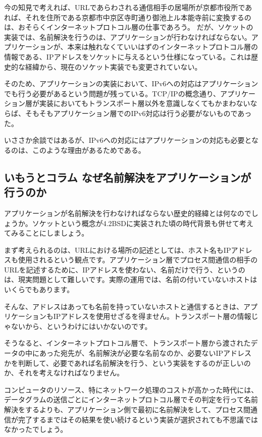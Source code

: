 今の知見で考えれば、URLであらわされる通信相手の居場所が京都市役所であれば、それを住所である京都市中京区寺町通り御池上ル本能寺前に変換するのは、おそらくインターネットプロトコル層の仕事であろう。
だが、ソケットの実装では、名前解決を行うのは、アプリケーションが行わなければならない。アプリケーションが、本来は触れなくていいはずのインターネットプロトコル層の情報である、IPアドレスをソケットに与えるという仕様になっている。これは歴史的な経緯から、現在のソケット実装でも変更されていない。

そのため、アプリケーションの実装において、IPv6への対応はアプリケーションでも行う必要があるという問題が残っている。TCP/IPの概念通り、アプリケーション層が実装においてもトランスポート層以外を意識しなくてもかまわないならば、そもそもアプリケーション層でのIPv6対応は行う必要がないものであった。

いささか余談ではあるが、IPv6への対応にはアプリケーションの対応も必要となるのは、このような理由があるためである。


\subsection*{いもうとコラム なぜ名前解決をアプリケーションが行うのか}
アプリケーションが名前解決を行わなければならない歴史的経緯とは何なのでしょうか。ソケットという概念が4.2BSDに実装された頃の時代背景も併せて考えてみることにしましょう。

まず考えられるのは、URLにおける場所の記述としては、ホスト名もIPアドレスも使用されるという観点です。アプリケーション層でプロセス間通信の相手のURLを記述するために、IPアドレスを使わない、名前だけで行う、というのは、現実問題として難しいです。実際の運用では、名前の付いていないホストはいくらでもあります。

そんな、アドレスはあっても名前を持っていないホストと通信するときは、アプリケーションもIPアドレスを使用せざるを得ません。トランスポート層の情報じゃないから、というわけにはいかないのです。

そうなると、インターネットプロトコル層で、トランスポート層から渡されたデータの中にあった宛先が、名前解決が必要な名前なのか、必要ないIPアドレスかを判断して、必要であれば名前解決を行う、という実装をするのが正しいのか、それを考えなければなりません。

コンピュータのリソース、特にネットワーク処理のコストが高かった時代には、データグラムの送信ごとにインターネットプロトコル層でその判定を行って名前解決をするよりも、アプリケーション側で最初に名前解決をして、プロセス間通信が完了するまではその結果を使い続けるという実装が選択されても不思議ではなかったでしょう。

